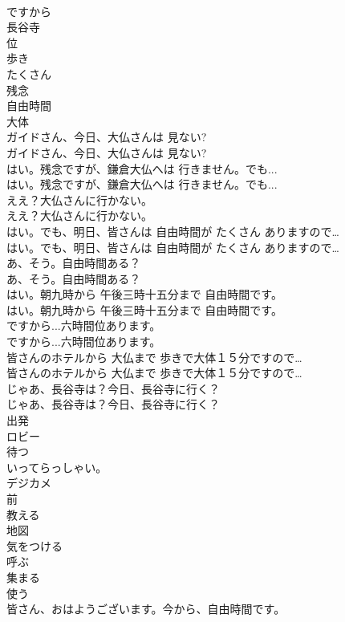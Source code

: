 \documentclass[8pt]{extreport}
\begin{document}
\begin{CJK}{UTF8}{min}
\\	ですから
\\	長谷寺
\\	位
\\	歩き
\\	たくさん
\\	残念
\\	自由時間
\\	大体
\\	ガイドさん、今日、大仏さんは 見ない?	
\\	ガイドさん、今日、大仏さんは 見ない? 
\\	はい。残念ですが、鎌倉大仏へは 行きません。でも...	
\\	はい。残念ですが、鎌倉大仏へは 行きません。でも... 
\\	ええ？大仏さんに行かない。	
\\	ええ？大仏さんに行かない。 
\\	はい。でも、明日、皆さんは 自由時間が たくさん ありますので…	
\\	はい。でも、明日、皆さんは 自由時間が たくさん ありますので… 
\\	あ、そう。自由時間ある？	
\\	あ、そう。自由時間ある？ 
\\	はい。朝九時から 午後三時十五分まで 自由時間です。	
\\	はい。朝九時から 午後三時十五分まで 自由時間です。 
\\	ですから...六時間位あります。	
\\	ですから...六時間位あります。 
\\	皆さんのホテルから 大仏まで 歩きで大体１５分ですので…	
\\	皆さんのホテルから 大仏まで 歩きで大体１５分ですので… 
\\	じゃあ、長谷寺は？今日、長谷寺に行く？	
\\	じゃあ、長谷寺は？今日、長谷寺に行く？ 
\\	出発
\\	ロビー
\\	待つ
\\	いってらっしゃい。
\\	デジカメ
\\	前
\\	教える
\\	地図
\\	気をつける
\\	呼ぶ
\\	集まる
\\	使う
\\	皆さん、おはようございます。今から、自由時間です。	

\end{CJK}
\end{document}

